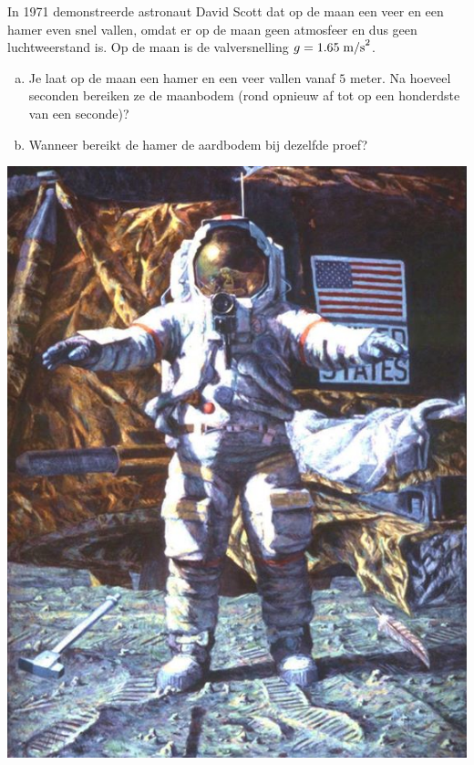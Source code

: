 \documentclass[12pt]{article}
\begin{document}
\begin{oefening}

\begin{minipage}{0.7\textwidth}
In 1971 demonstreerde astronaut David Scott dat op de maan een veer en een hamer even snel vallen, omdat er op de maan geen atmosfeer en dus geen luchtweerstand is. Op de maan is de valversnelling $g=1.65 \;\mbox{m/s}^2$.\\

\begin{enumerate}[(a)]
  \item Je laat op de maan een hamer en een veer vallen vanaf $5$ meter. Na hoeveel seconden bereiken ze de maanbodem (rond opnieuw af tot op een honderdste van een seconde)?
  \item Wanneer bereikt de hamer de aardbodem bij dezelfde proef?
\end{enumerate}
\end{minipage}
\begin{minipage}{0.29\textwidth}
\vspace*{-0.4cm}
\includegraphics[width=1\textwidth]{hammerfeather}  
\end{minipage}

\end{oefening}
\end{document}

